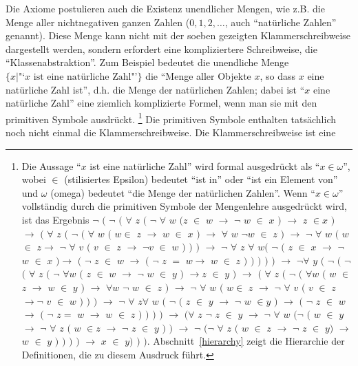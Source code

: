Die Axiome postulieren auch die Existenz unendlicher Mengen, wie z.B. die Menge aller nichtnegativen ganzen Zahlen ($0, 1,2,\ldots$, auch "`natürliche Zahlen"' genannt).  Diese Menge kann nicht mit der soeben gezeigten Klammerschreibweise dargestellt werden, sondern erfordert eine kompliziertere Schreibweise, die "`Klassenabstraktion"'.  Zum Beispiel bedeutet die unendliche Menge $\{ x |\mbox{"`$x$ ist eine natürliche Zahl"'} \} $ die "`Menge aller Objekte $x$, so dass $x$ eine natürliche Zahl ist"', d.h. die Menge der natürlichen Zahlen; dabei ist "`$x$ eine natürliche Zahl"' eine ziemlich komplizierte Formel, wenn man sie mit den primitiven Symbole ausdrückt. \label{expandom}\footnote{Die Aussage "`$x$ ist eine natürliche Zahl"' wird formal ausgedrückt als "`$x \in \omega$"', wobei $\in$ (stilisiertes Epsilon) bedeutet "`ist in"' oder "`ist ein Element von"' und $\omega$ (omega) bedeutet "`die Menge der natürlichen Zahlen"'.  Wenn "`$x\in\omega$"' vollständig durch die primitiven Symbole der Mengenlehre ausgedrückt wird, ist das Ergebnis $\lnot$ $($ $\lnot$ $($ $\forall$ $z$ $($ $\lnot$ $\forall$ $w$ $($$z$ $\in$ $w$ $\rightarrow$ $\lnot$ $w$ $\in$ $x$ $)$ $\rightarrow$ $z$ $\in$$x$ $)$ $\rightarrow$ $($ $\forall$ $z$ $($ $\lnot$ $($ $\forall$ $w$ $($ $w$$\in$ $z$ $\rightarrow$ $w$ $\in$ $x$ $)$ $\rightarrow$ $\forall$ $w$ $\lnot$$w$ $\in$ $z$ $)$ $\rightarrow$ $\lnot$ $\forall$ $w$ $($ $w$ $\in$ $z$$\rightarrow$ $\lnot$ $\forall$ $v$ $($ $v$ $\in$ $z$ $\rightarrow$ $\lnot$$v$ $\in$ $w$ $)$ $)$ $)$ $\rightarrow$ $\lnot$ $\forall$ $z$ $\forall$ $w$$($ $\lnot$ $($ $z$ $\in$ $x$ $\rightarrow$ $\lnot$ $w$ $\in$ $x$ $)$$\rightarrow$ $($ $\lnot$ $z$ $\in$ $w$ $\rightarrow$ $($ $\lnot$ $z$ $=$ $w$$\rightarrow$ $w$ $\in$ $z$ $)$ $)$ $)$ $)$ $)$ $\rightarrow$ $\lnot$$\forall$ $y$ $($ $\lnot$ $($ $\lnot$ $($ $\forall$ $z$ $($ $\lnot$ $\forall$$w$ $($ $z$ $\in$ $w$ $\rightarrow$ $\lnot$ $w$ $\in$ $y$ $)$ $\rightarrow$$z$ $\in$ $y$ $)$ $\rightarrow$ $($ $\forall$ $z$ $($ $\lnot$ $($ $\forall$$w$ $($ $w$ $\in$ $z$ $\rightarrow$ $w$ $\in$ $y$ $)$ $\rightarrow$ $\forall$$w$ $\lnot$ $w$ $\in$ $z$ $)$ $\rightarrow$ $\lnot$ $\forall$ $w$ $($ $w$$\in$ $z$ $\rightarrow$ $\lnot$ $\forall$ $v$ $($ $v$ $\in$ $z$ $\rightarrow$$\lnot$ $v$ $\in$ $w$ $)$ $)$ $)$ $\rightarrow$ $\lnot$ $\forall$ $z$$\forall$ $w$ $($ $\lnot$ $($ $z$ $\in$ $y$ $\rightarrow$ $\lnot$ $w$ $\in$$y$ $)$ $\rightarrow$ $($ $\lnot$ $z$ $\in$ $w$ $\rightarrow$ $($ $\lnot$ $z$$=$ $w$ $\rightarrow$ $w$ $\in$ $z$ $)$ $)$ $)$ $)$ $\rightarrow$ $($$\forall$ $z$ $\lnot$ $z$ $\in$ $y$ $\rightarrow$ $\lnot$ $\forall$ $w$ $($$\lnot$ $($ $w$ $\in$ $y$ $\rightarrow$ $\lnot$ $\forall$ $z$ $($ $w$ $\in$$z$ $\rightarrow$ $\lnot$ $z$ $\in$ $y$ $)$ $)$ $\rightarrow$ $\lnot$ $($$\lnot$ $\forall$ $z$ $($ $w$ $\in$ $z$ $\rightarrow$ $\lnot$ $z$ $\in$ $y$$)$ $\rightarrow$ $w$ $\in$ $y$ $)$ $)$ $)$ $)$ $\rightarrow$ $x$ $\in$ $y$$)$ $)$ $)$. Abschnitt~\ref{hierarchy} zeigt die Hierarchie der Definitionen, die zu diesem Ausdruck führt.}  Die primitiven Symbole enthalten tatsächlich noch nicht einmal die Klammerschreibweise.  Die Klammerschreibweise ist eine 